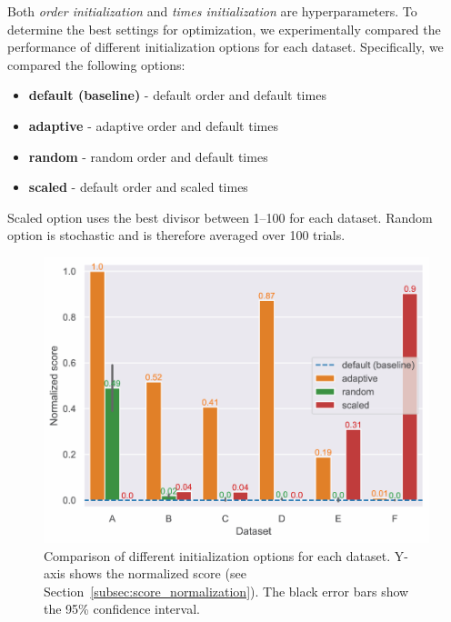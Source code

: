 \medskip

Both \textit{order initialization} and \textit{times initialization} are hyperparameters.
To determine the best settings for optimization, we experimentally compared the performance of different initialization options for each dataset.
Specifically, we compared the following options:
\begin{itemize}
    \item \textcolor{myblue}{\textbf{default (baseline)}} - default order and default times
    \item \textcolor{myorange}{\textbf{adaptive}} - adaptive order and default times
    \item \textcolor{mygreen}{\textbf{random}} - random order and default times
    \item \textcolor{myred}{\textbf{scaled}} - default order and scaled times
\end{itemize}
Scaled option uses the best divisor between 1--100 for each dataset.
Random option is stochastic and is therefore averaged over 100 trials.

\begin{figure}[h]
    \centering
    \includegraphics[width=\linewidth]{img/experiments/pdfa-init_experiment.pdf}
    \caption[Comparison of initialization options]{
        Comparison of different initialization options for each dataset.
        Y-axis shows the normalized score (see Section~\ref{subsec:score_normalization}).
        The black error bars show the 95\% confidence interval.
    }
    \label{fig:init_comparison}
\end{figure}

